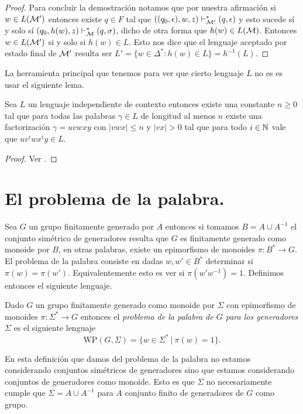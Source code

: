 \documentclass[tesis.tex]{subfiles}
\begin{document}
\begin{proof}
	Para concluir la demostración notamos que por nuestra afirmación si $w \in L(\cal M')$ entonces existe $q \in F$ tal que $ ((q_0, \epsilon),w,z) \vdash^*_{\cal M'} (q,\epsilon) $ y esto sucede sí y solo sí $(q_0,h(w), z) \vdash^*_{\cal M} (q, \sigma)$, dicho de otra forma que $h(w) \in L(\cal M)$.	
	Entonces $w \in L(\cal M')$ si y solo si $h(w) \in L$.
	Esto nos dice que el lenguaje aceptado por estado final de $\cal M'$ resulta ser $L' = \{ w \in \Delta^* : h(w) \in L \} = h^{-1}(L)$.
\end{proof}

La herramienta principal que tenemos para ver que cierto lenguaje $L$ no es \ic es usar el siguiente lema.

\begin{lema}[Pumping] \label{pumping}
	Sea $L$ un lenguaje independiente de contexto entonces existe una constante $n \ge 0$ tal que para todas las palabras $\gamma \in L$ de longitud al menos $n$ existe una factorización $\gamma = uvwxy$ con $|vwx| \le n$ y $|vx| > 0$ tal que para todo $i \in \mathbb{N}$ vale que $uv^iwx^iy \in L$.
\end{lema}

\begin{proof}
	Ver \cite[p.281]{hopcraft-ullman}.
\end{proof}



\section{El problema de la palabra.}\label{secc_wp}


Sea $G$ un grupo finitamente generado por $A$ entonces si tomamos $B = A \cup A^{-1}$ el conjunto simétrico de generadores resulta que $G$ es finitamente generado como monoide por $B$, en otras palabras, existe un epimorfismo de monoides $\pi:B^* \to G$.
El problema de la palabra consiste en dadas $w,w' \in B^*$ determinar si $\pi(w) {=} \pi(w')$.
Equivalentemente esto es ver si $\pi(w'w^{-1}) = 1$.
Definimos entonces el siguiente lenguaje.

\begin{deff}
	Dado $G$ un grupo finitamente generado como monoide por $\Sigma$ 
	con epimorfismo de monoides $\pi:\Sigma^* \to G$ entonces
	el \emph{problema de la palabra de $G$ para los generadores $\Sigma$} es el siguiente lenguaje	
	\[ 
	\text{WP} (G, \Sigma) = \{ w \in \Sigma^* \ | \ \pi(w)= 1 \}.
	\]
\end{deff}

\begin{obs}
	En esta definición que damos del problema de la palabra no estamos considerando conjuntos simétricos de generadores sino que estamos considerando conjuntos de generadores como monoide.
	Esto es que $\Sigma$ no necesariamente cumple que $\Sigma = A \cup A^{-1}$ para $A$ conjunto finito de generadores de $G$ como grupo.
\end{obs}
\end{document}
